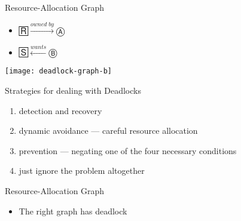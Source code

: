 \begin{frame}{Resource-Allocation Graph}
  \begin{center}
    \begin{minipage}{.3\linewidth}\Large
      \begin{itemize}
      \item[] 🅁\(\xrightarrow{owned\;by}\)Ⓐ
      \item[] 🅂\(\xleftarrow{wants}\)Ⓑ
      \end{itemize}
    \end{minipage}\qquad
    \begin{minipage}{.2\linewidth}
      \texttt{[image: deadlock-graph-b]}
    \end{minipage}
  \end{center}
  \begin{block}{Strategies for dealing with Deadlocks}
    \begin{enumerate}
    \item detection and recovery
    \item dynamic avoidance --- careful resource allocation
    \item prevention --- negating one of the four necessary conditions
    \item just ignore the problem altogether
    \end{enumerate}
  \end{block}
\end{frame}

\begin{frame}{Resource-Allocation Graph}
  \begin{minipage}{.49\linewidth}
    \begin{center}
    \end{center}
  \end{minipage}\hfill
  \begin{minipage}{.49\linewidth}
    \begin{center}
    \end{center}
  \end{minipage}
\end{frame}

\begin{itemize}
\item The right graph has deadlock
\end{itemize}

